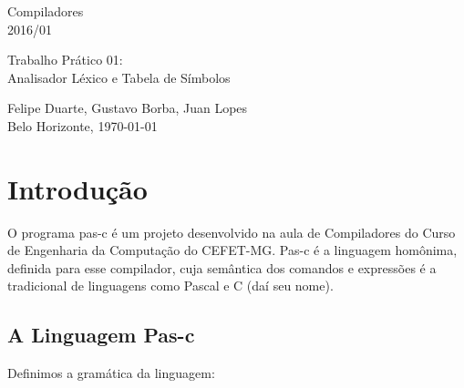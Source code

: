 \documentclass[11pt]{article}
\begin{document}
\thispagestyle{empty}

\begin{center}
\begin{minipage}[l]{10cm}{
\center
Compiladores \\
2016/01 \\
}\end{minipage}
 \vfill
 \begin{minipage}[l]{11cm}{
   \begin{center}
   \Large{Trabalho Prático 01: \\ Analisador Léxico e Tabela de Símbolos}
   \end{center}
}\end{minipage}
\end{center}
 \vspace*{8cm}
 \begin{center}
 \begin{minipage}[l]{10cm}{
 \center Felipe Duarte, Gustavo  Borba, Juan Lopes\\
 Belo Horizonte, \today \\
 }
 \end{minipage}
 \end{center}

\newpage
\thispagestyle{empty}
\tableofcontents

\newpage
\clearpage
\setcounter{page}{1}

\section{Introdução}
	O programa pas-c é um projeto desenvolvido na aula de Compiladores do Curso de Engenharia da Computação do CEFET-MG. Pas-c é a linguagem homônima, definida para esse compilador, cuja semântica dos comandos e expressões é a tradicional de linguagens como Pascal e C (daí seu nome).
	
	\subsection{A Linguagem Pas-c}
	\label{gramatica}

		Definimos a gramática da linguagem:
		
\end{document}
